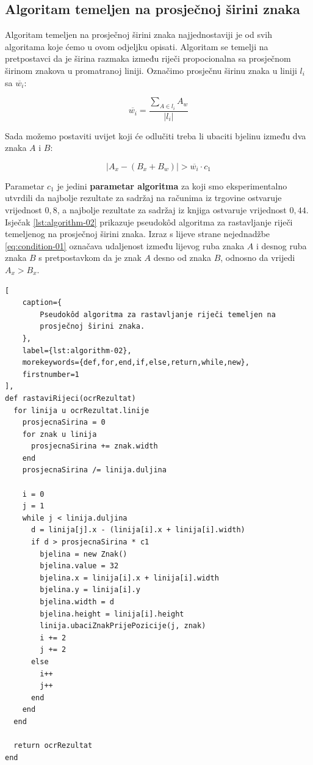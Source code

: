 \documentclass[times, utf8, zavrsni]{fer}
\begin{document}
\subsection{Algoritam temeljen na prosječnoj širini znaka}
Algoritam temeljen na prosječnoj širini znaka najjednostaviji je od svih
algoritama koje ćemo u ovom odjeljku opisati. Algoritam se temelji na
pretpostavci da je širina razmaka između riječi propocionalna sa prosječnom
širinom znakova u promatranoj liniji. Označimo prosječnu širinu znaka u liniji
$l_i$ sa $\overline{w_i}$:

\begin{equation}
\overline{w_i} = \frac{\sum\limits_{A \in l_i} A_w}{|l_i|}
\end{equation}

Sada možemo postaviti uvijet koji će odlučiti treba li ubaciti bjelinu između
dva znaka $A$ i $B$:

\begin{equation}
\label{eq:condition-01}
|A_x - (B_x + B_w)| > \overline{w_i} \cdot c_1
\end{equation}

Parametar $c_1$ je jedini \textbf{parametar algoritma} za koji smo
eksperimentalno utvrdili da najbolje rezultate za sadržaj na računima iz
trgovine ostvaruje vrijednost $0{,}8$, a najbolje rezultate za sadržaj iz knjiga
ostvaruje vrijednost $0{,}44$. Isječak \ref{lst:algorithm-02} prikazuje
pseudokôd algoritma za rastavljanje riječi temeljenog na prosječnoj širini
znaka. Izraz s lijeve strane nejednadžbe \ref{eq:condition-01} označava
udaljenost između lijevog ruba znaka $A$ i desnog ruba znaka $B$ s pretpostavkom
da je znak $A$ desno od znaka $B$, odnosno da vrijedi $A_x > B_x$.

\begin{lstlisting}[
    caption={
        Pseudokôd algoritma za rastavljanje riječi temeljen na
        prosječnoj širini znaka.
    },
    label={lst:algorithm-02},
    morekeywords={def,for,end,if,else,return,while,new},
    firstnumber=1
],
def rastaviRijeci(ocrRezultat)
  for linija u ocrRezultat.linije
    prosjecnaSirina = 0
    for znak u linija
      prosjecnaSirina += znak.width
    end
    prosjecnaSirina /= linija.duljina

    i = 0
    j = 1
    while j < linija.duljina
      d = linija[j].x - (linija[i].x + linija[i].width)
      if d > prosjecnaSirina * c1
        bjelina = new Znak()
        bjelina.value = 32
        bjelina.x = linija[i].x + linija[i].width
        bjelina.y = linija[i].y
        bjelina.width = d
        bjelina.height = linija[i].height
        linija.ubaciZnakPrijePozicije(j, znak)
        i += 2
        j += 2
      else
        i++
        j++
      end
    end
  end

  return ocrRezultat
end
\end{lstlisting}
\end{document}
